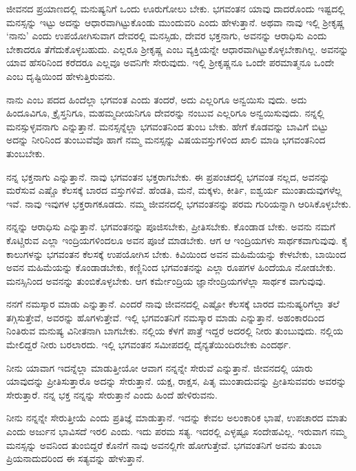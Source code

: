 ಜೀವನದ ಪ್ರಯಾಣದಲ್ಲಿ ಮನುಷ್ಯನಿಗೆ ಒಂದು ಊರುಗೋಲು ಬೇಕು. ಭಗವಂತನ ಯಾವು ದಾದರೊಂದು ಇಷ್ಟದಲ್ಲಿ ಮನಸ್ಸನ್ನು ಇಟ್ಟು ಅದನ್ನು ಆಧಾರವಾಗಿಟ್ಟುಕೊಂಡು ಮುಂದುವರಿ ಎಂದು ಹೇಳುತ್ತಾನೆ. ಅಥವಾ ನಾವು ಇಲ್ಲಿ ಶ್ರೀಕೃಷ್ಣ ‘ನಾನು’ ಎಂದು ಉಪಯೋಗಿಸುವಾಗ ದೇವರಲ್ಲಿ ಮನಸ್ಸಿಡು, ದೇವರ ಭಕ್ತನಾಗು, ಅವನನ್ನು ಆರಾಧಿಸು ಎಂದು ಬೇಕಾದರೂ ತೆಗೆದುಕೊಳ್ಳಬಹುದು. ಎಲ್ಲರೂ ಶ್ರೀಕೃಷ್ಣ ಎಂಬ ವ್ಯಕ್ತಿಯನ್ನೇ ಆಧಾರವಾಗಿಟ್ಟುಕೊಳ್ಳಬೇಕಾಗಿಲ್ಲ. ಅವನನ್ನು ಯಾವ ಹೆಸರಿನಿಂದ ಕರೆದರೂ ಎಲ್ಲವೂ ಅವನಿಗೇ ಸೇರುವುದು. ಇಲ್ಲಿ ಶ್ರೀಕೃಷ್ಣನೂ ಒಂದೇ ಪರಮಾತ್ಮನೂ ಒಂದೇ ಎಂಬ ದೃಷ್ಟಿಯಿಂದ ಹೇಳುತ್ತಿರುವನು.

ನಾನು ಎಂಬ ಪದದ ಹಿಂದೆಲ್ಲಾ ಭಗವಂತ ಎಂದು ತಂದರೆ, ಅದು ಎಲ್ಲರಿಗೂ ಅನ್ವಯಿಸು ವುದು. ಅದು ಹಿಂದೂವಿಗೂ, ಕ್ರೈಸ್ತನಿಗೂ, ಮಹಮ್ಮದೀಯನಿಗೂ ದೇವರನ್ನು ನಂಬುವ ಎಲ್ಲರಿಗೂ ಅನ್ವಯಿಸುವುದು. ನನ್ನಲ್ಲಿ ಮನಸ್ಸುಳ್ಳವನಾಗು ಎನ್ನುತ್ತಾನೆ. ಮನಸ್ಸನ್ನೆಲ್ಲಾ ಭಗವಂತನಿಂದ ತುಂಬ ಬೇಕು. ಹೇಗೆ ಕೊಡವನ್ನು ಬಾವಿಗೆ ಬಿಟ್ಟು ಅದನ್ನು ನೀರಿನಿಂದ ತುಂಬುವೆವೊ ಹಾಗೆ ನಮ್ಮ ಮನಸ್ಸನ್ನು ವಿಷಯವಸ್ತುಗಳಿಂದ ಖಾಲಿ ಮಾಡಿ ಭಗವಂತನಿಂದ ತುಂಬಬೇಕು.

ನನ್ನ ಭಕ್ತನಾಗು ಎನ್ನುತ್ತಾನೆ. ನಾವು ಭಗವಂತನ ಭಕ್ತರಾಗಬೇಕು. ಈ ಪ್ರಪಂಚದಲ್ಲಿ ಭಗವಂತ ನಲ್ಲದ, ಅವನನ್ನು ಮರೆಸುವ ಎಷ್ಚೊ ಕೆಲಸಕ್ಕೆ ಬಾರದ ವಸ್ತುಗಳಿವೆ. ಹೆಂಡತಿ, ಮನೆ, ಮಕ್ಕಳು, ಕೀರ್ತಿ, ಐಶ್ವರ್ಯ ಮುಂತಾದುವುಗಳೆಲ್ಲ ಇವೆ. ನಾವು ಇವುಗಳ ಭಕ್ತರಾಗಕೂಡದು. ನಮ್ಮ ಜೀವನದಲ್ಲಿ ಭಗವಂತನನ್ನು ಪರಮ ಗುರಿಯನ್ನಾಗಿ ಆರಿಸಿಕೊಳ್ಳಬೇಕು.

ನನ್ನನ್ನು ಆರಾಧಿಸು ಎನ್ನುತ್ತಾನೆ. ಭಗವಂತನನ್ನು ಪೂಜಿಸಬೇಕು, ಪ್ರೀತಿಸಬೇಕು. ಕೊಂಡಾಡ ಬೇಕು. ಅವನು ನಮಗೆ ಕೊಟ್ಚಿರುವ ಎಲ್ಲಾ ಇಂದ್ರಿಯಗಳಿಂದಲೂ ಅವನ ಪೂಜೆ ಮಾಡಬೇಕು. ಆಗ ಆ ಇಂದ್ರಿಯಗಳು ಸಾರ್ಥಕವಾಗುವುವು. ಕೈ ಕಾಲುಗಳನ್ನು ಭಗವಂತನ ಕೆಲಸಕ್ಕೆ ಉಪಯೋಗಿಸ ಬೇಕು. ಕಿವಿಯಿಂದ ಅವನ ಮಹಿಮೆಯನ್ನು ಕೇಳಬೇಕು, ಬಾಯಿಂದ ಅವನ ಮಹಿಮೆಯನ್ನು ಕೊಂಡಾಡಬೇಕು, ಕಣ್ಣಿನಿಂದ ಭಗವಂತನನ್ನು ಎಲ್ಲಾ ರೂಪಗಳ ಹಿಂದೆಯೂ ನೋಡಬೇಕು. ಮನಸ್ಸಿನಿಂದ ಅವನನ್ನು ತುಂಬಿಕೊಳ್ಳಬೇಕು. ಆಗ ಕರ್ಮೇಂದ್ರಿಯ ಜ್ಞಾನೇಂದ್ರಿಯಗಳೆಲ್ಲಾ ಸಾರ್ಥಕ ವಾಗುವುವು.

ನನಗೆ ನಮಸ್ಕಾರ ಮಾಡು ಎನ್ನುತ್ತಾನೆ. ಎಂದರೆ ನಾವು ಜೀವನದಲ್ಲಿ ಎಷ್ಟೋ ಕೆಲಸಕ್ಕೆ ಬಾರದ ಮನುಷ್ಯರಿಗೆಲ್ಲಾ ತಲೆ ತಗ್ಗಿಸುತ್ತೇವೆ, ಅವರನ್ನು ಹೊಗಳುತ್ತೇವೆ. ಇಲ್ಲಿ ಭಗವಂತನಿಗೆ ನಮಸ್ಕಾರ ಮಾಡು ಎನ್ನುತ್ತಾನೆ. ಅಹಂಕಾರದಿಂದ ನಿಂತಿರುವ ಮನುಷ್ಯ ವಿನೀತನಾಗಿ ಬಾಗಬೇಕು. ನಲ್ಲಿಯ ಕೆಳಗೆ ಪಾತ್ರೆ ಇದ್ದರೆ ಅದರಲ್ಲಿ ನೀರು ತುಂಬುವುದು. ನಲ್ಲಿಯ ಮೇಲಿದ್ದರೆ ನೀರು ಬರಲಾರದು. ಇಲ್ಲಿ ಭಗವಂತನ ಸಮೀಪದಲ್ಲಿ ದೈನ್ಯತೆಯಿಂದಿರಬೇಕು ಎಂದರ್ಥ.

ನೀನು ಯಾವಾಗ ಇದನ್ನೆಲ್ಲಾ ಮಾಡುತ್ತೀಯೋ ಆವಾಗ ನನ್ನನ್ನೇ ಸೇರುವೆ ಎನ್ನುತ್ತಾನೆ. ಜೀವನದಲ್ಲಿ ಯಾರು ಯಾವುದನ್ನು ಪ್ರೀತಿಸುತ್ತಾರೊ ಅದನ್ನು ಸೇರುತ್ತಾನೆ. ಯಕ್ಷ, ರಾಕ್ಷಸ, ಪಿತೃ ಮುಂತಾದುವನ್ನು ಪ್ರೀತಿಸುವವರು ಅವರನ್ನು ಸೇರುತ್ತಾರೆ. ನನ್ನ ಭಕ್ತ ನನ್ನನ್ನು ಸೇರುತ್ತಾನೆ ಎಂದು ಹಿಂದೆ ಹೇಳಿರುವನು.

ನೀನು ನನ್ನನ್ನೇ ಸೇರುತ್ತೀಯೆ ಎಂದು ಪ್ರತಿಜ್ಞೆ ಮಾಡುತ್ತಾನೆ. ಇದನ್ನು ಕೇವಲ ಅಲಂಕಾರಿಕ ಭಾಷೆ, ಉಪಚಾರದ ಮಾತು ಎಂದು ಅರ್ಜುನ ಭಾವಿಸದೆ ಇರಲಿ ಎಂದು. ಇದು ಪರಮ ಸತ್ಯ. ಇದರಲ್ಲಿ ಎಳ್ಳಷ್ಟೂ ಸಂದೇಹವಿಲ್ಲ. ಇರುವಾಗ ನಮ್ಮ ಮನಸ್ಸನ್ನು ಅವನಿಂದ ತುಂಬಿದ್ದರೆ ಕೊನೆಗೆ ನಾವು ಅವನಲ್ಲಿಗೇ ಹೋಗುತ್ತೇವೆ. ಭಗವಂತನಿಗೆ ಅವನು ತುಂಬಾ ಪ್ರಿಯನಾದುದರಿಂದ ಈ ಸತ್ಯವನ್ನು ಹೇಳುತ್ತಾನೆ.


